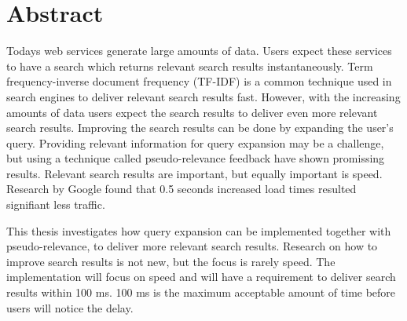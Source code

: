 \chapter*{Abstract}
Todays web services generate large amounts of data.
Users expect these services to have a search which returns relevant search results instantaneously.
Term frequency-inverse document frequency (TF-IDF) is a common technique used in search engines to deliver relevant search results fast.
However,
with the increasing amounts of data users expect the search results to deliver even more relevant search results.
Improving the search results can be done by expanding the user's query.
Providing relevant information for query expansion may be a challenge,
but using a technique called pseudo-relevance feedback have shown promissing results.
Relevant search results are important, but equally important is speed.
Research by Google \cite{google-marissa} found that 0.5 seconds increased load times resulted signifiant less traffic.

This thesis investigates how query expansion can be implemented together with pseudo-relevance,
to deliver more relevant search results.
Research on how to improve search results is not new,
but the focus is rarely speed.
The implementation will focus on speed and will have a requirement to deliver search results within 100 ms.
100 ms is the maximum acceptable amount of time before users will notice the delay.

